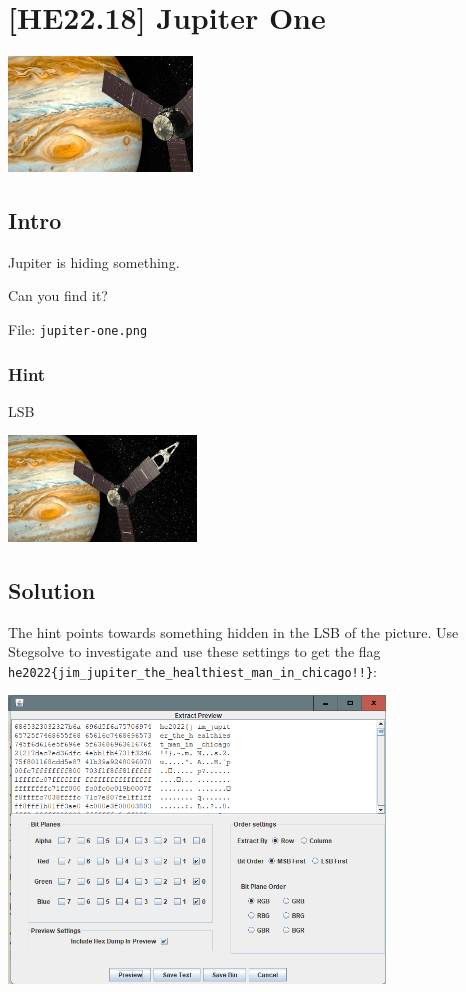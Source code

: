 
\hypertarget{he22.18}{%
\chapter{[HE22.18] Jupiter One}\label{he22.18}}

\begin{marginfigure}
	\includegraphics[width=49mm]{level5/challenge18.jpg}
\end{marginfigure}
\section{Intro}
Jupiter is hiding something.

Can you find it?

File: \verb+jupiter-one.png+

\subsection{Hint}
LSB
\begin{marginfigure}
	\includegraphics[width=50mm]{level5/jupiter-one.png}
\end{marginfigure}
\section{Solution}\label{hv22.18solution}
The hint points towards something hidden in the LSB of the picture.  Use Stegsolve to investigate and use these settings to get the flag \verb+he2022{jim_jupiter_the_healthiest_man_in_chicago!!}+:

	\includegraphics[width=100mm]{level5/solution18.png}
	









